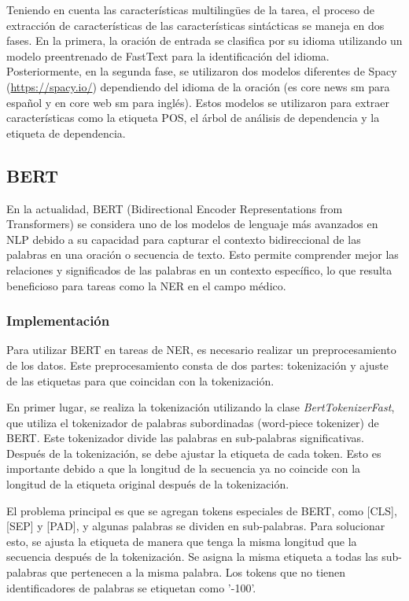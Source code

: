 \documentclass[10pt]{article} %
\begin{document}
	Teniendo en cuenta las características multilingües de la tarea, el proceso de extracción de características de las características sintácticas se maneja en dos fases. En la primera, la oración de entrada se clasifica por su idioma utilizando un modelo preentrenado de FastText para la identificación del idioma. Posteriormente, en la segunda fase, se utilizaron dos modelos diferentes de Spacy (\url{https://spacy.io/}) dependiendo del idioma de la oración (es core news sm para español y en core web sm para inglés). Estos modelos se utilizaron para extraer características como la etiqueta POS, el árbol de análisis de dependencia y la etiqueta de dependencia.
	
	\subsection{BERT}
	
	En la actualidad, BERT (Bidirectional Encoder Representations from Transformers) se considera uno de los modelos de lenguaje más avanzados en NLP debido a su capacidad para capturar el contexto bidireccional de las palabras en una oración o secuencia de texto. Esto permite comprender mejor las relaciones y significados de las palabras en un contexto específico, lo que resulta beneficioso para tareas como la NER en el campo médico.
	
	\subsubsection{Implementaci\'on}
	
	 Para utilizar BERT en tareas de NER, es necesario realizar un preprocesamiento de los datos. Este preprocesamiento consta de dos partes: tokenización y ajuste de las etiquetas para que coincidan con la tokenización.
	
	En primer lugar, se realiza la tokenización utilizando la clase \textit{BertTokenizerFast}, que utiliza el tokenizador de palabras subordinadas (word-piece tokenizer) de BERT. Este tokenizador divide las palabras en sub-palabras significativas. Después de la tokenización, se debe ajustar la etiqueta de cada token. Esto es importante debido a que la longitud de la secuencia ya no coincide con la longitud de la etiqueta original después de la tokenización.
	
	El problema principal es que se agregan tokens especiales de BERT, como [CLS], [SEP] y [PAD], y algunas palabras se dividen en sub-palabras. Para solucionar esto, se ajusta la etiqueta de manera que tenga la misma longitud que la secuencia después de la tokenización. Se asigna la misma etiqueta a todas las sub-palabras que pertenecen a la misma palabra. Los tokens que no tienen identificadores de palabras se etiquetan como '-100'.
	
\end{document}
